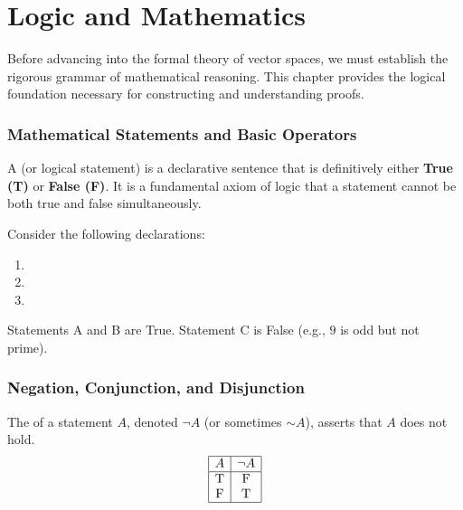 \setcounter{chapter}{1}
\renewcommand{\thetheorem}{\thechapter.\arabic{theorem}}
\setcounter{theorem}{0}


\chapter{Logic and Mathematics}

Before advancing into the formal theory of vector spaces, we must establish the rigorous grammar of mathematical reasoning. This chapter provides the logical foundation necessary for constructing and understanding proofs.

\subsection{Mathematical Statements and Basic Operators}

\begin{definition}
A  (or logical statement) is a declarative sentence that is definitively either \textbf{True (T)} or \textbf{False (F)}. It is a fundamental axiom of logic that a statement cannot be both true and false simultaneously.
\end{definition}

\begin{example}
Consider the following declarations:
\begin{enumerate}[label=\textbf{\Alph*}:]
    \item {}
    \item {}
    \item {}
\end{enumerate}
Statements A and B are True. Statement C is False (e.g., $9$ is odd but not prime).
\end{example}

\subsection{Negation, Conjunction, and Disjunction}

\begin{definition}[Negation]
The  of a statement $A$, denoted $\neg A$ (or sometimes $\sim A$), asserts that $A$ does not hold.
\[
\begin{array}{|c|c|}
\hline
A & \neg A \\
\hline
\text{T} & \text{F} \\
\text{F} & \text{T} \\
\hline
\end{array}
\]
\end{definition}

